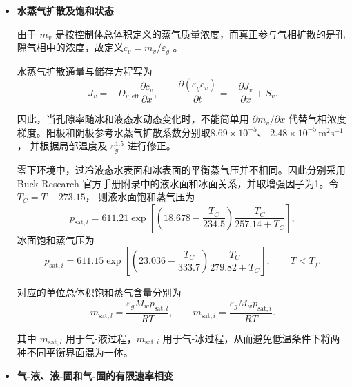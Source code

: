 \documentclass[bwprint]{gmcmthesis}
\numberwithin{equation}{section}
\numberwithin{figure}{section}
\begin{document}
\begin{itemize}
 其他区域取 \(S_w = 0\)。其中
\[
M_w = 0.018 \, \text{kg mol}^{-1}, \qquad F = 96485 \, \text{C mol}^{-1}.
\]

 本题将电化学生成水首先计入阴极 CL 的液态水，再由有限速率相变模型重新进行相态分配。

\item \textbf {水蒸气扩散及饱和状态}


 由于 \(m_v\) 是按控制体总体积定义的蒸气质量浓度，而真正参与气相扩散的是孔隙气相中的浓度，故定义$c_v = m_v/\varepsilon_g$ 。

 水蒸气扩散通量与储存方程写为
\begin{equation}
J_v = -D_{v,\text{eff}} \frac{\partial c_v}{\partial x}, \qquad \frac{\partial(\varepsilon_g c_v)}{\partial t} = -\frac{\partial J_v}{\partial x} + S_v. \label{eq:src:4-24}
\end{equation}

 因此，当孔隙率随冰和液态水动态变化时，不能简单用 \(\partial m_v/\partial x\) 代替气相浓度梯度。阳极和阴极参考水蒸气扩散系数分别取$8.69 \times 10^{-5}$、 $2.48 \times 10^{-5} \, \text{m}^2\text{s}^{-1}$，
并根据局部温度及 \(\varepsilon_g^{1.5}\) 进行修正。

 零下环境中，过冷液态水表面和冰表面的平衡蒸气压并不相同。因此分别采用 Buck Research 官方手册附录中的液水面和冰面关系\cite{buck1996manual}，并取增强因子为1。令$T_C = T - 273.15$，
则液水面饱和蒸气压为
\begin{equation}
p_{\text{sat},l} = 611.21 \exp\left[ \left(18.678 - \frac{T_C}{234.5}\right) \frac{T_C}{257.14 + T_C} \right],
\label{eq:src:4-25}
\end{equation}
冰面饱和蒸气压为
\begin{equation}
p_{\text{sat},i} = 611.15 \exp\left[ \left(23.036 - \frac{T_C}{333.7}\right) \frac{T_C}{279.82 + T_C} \right], \qquad T < T_f. \label{eq:src:4-26}
\end{equation}

 对应的单位总体积饱和蒸气含量分别为
\begin{equation}
m_{\text{sat},l} = \frac{\varepsilon_g M_w p_{\text{sat},l}}{RT}, \qquad m_{\text{sat},i} = \frac{\varepsilon_g M_w p_{\text{sat},i}}{RT}. \label{eq:src:4-27}
\end{equation}

 其中 \(m_{\text{sat},l}\) 用于气-液过程，\(m_{\text{sat},i}\) 用于气-冰过程，从而避免低温条件下将两种不同平衡界面混为一体。


\item \textbf {气-液、液-固和气-固的有限速率相变}


\end{itemize}
\end{document}
